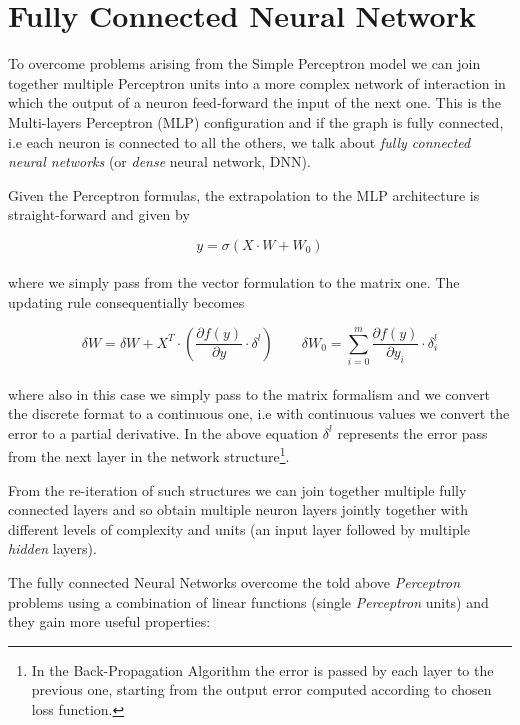 \documentclass{standalone}
\begin{document}
\section[Fully Connected Neural Network]{Fully Connected Neural Network}\label{NN:connected}

To overcome problems arising from the Simple Perceptron model we can join together multiple Perceptron units into a more complex network of interaction in which the output of a neuron feed-forward the input of the next one.
This is the Multi-layers Perceptron (MLP) configuration and if the graph is fully connected, i.e each neuron is connected to all the others, we talk about \emph{fully connected neural networks} (or \emph{dense} neural network, DNN).

Given the Perceptron formulas, the extrapolation to the MLP architecture is straight-forward and given by

$$
y = \sigma\left(X \cdot W + W_0 \right)
$$
\\
where we simply pass from the vector formulation to the matrix one.
The updating rule consequentially becomes

$$
\delta W = \delta W + X^T \cdot \left( \frac{\partial f(y)}{\partial y} \cdot \delta^l \right)  \quad\quad \delta W_0 = \sum_{i=0}^{m}\frac{\partial f(y)}{\partial y_i} \cdot \delta_i^l
$$
\\
where also in this case we simply pass to the matrix formalism and we convert the discrete format to a continuous one, i.e with continuous values we convert the error to a partial derivative.
In the above equation $\delta^l$ represents the error pass from the next layer in the network structure\footnote{
  In the Back-Propagation Algorithm the error is passed by each layer to the previous one, starting from the output error computed according to chosen loss function.
}.

From the re-iteration of such structures we can join together multiple fully connected layers and so obtain multiple neuron layers jointly together with different levels of complexity and units (an input layer followed by multiple \emph{hidden} layers).

The fully connected Neural Networks overcome the told above \emph{Perceptron} problems using a combination of linear functions (single \emph{Perceptron} units) and they gain more useful properties:
\end{document}
